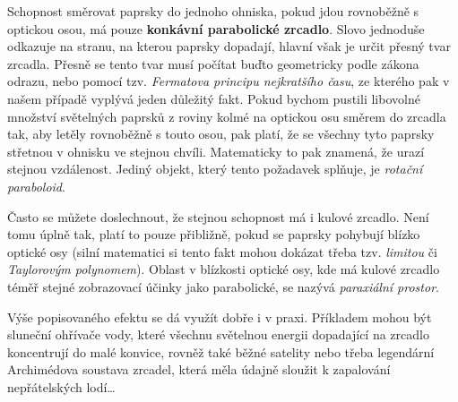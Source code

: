 \documentclass{../../../../style/mkimain}
\begin{document}
\noindent{}
\klein
Schopnost směrovat paprsky do jednoho ohniska, pokud jdou rovnoběžně s optickou osou, má pouze \textbf{konkávní parabolické zrcadlo}.
Slovo  jednoduše odkazuje na stranu, na kterou paprsky dopadají, hlavní však je určit přesný tvar zrcadla.
Přesně se tento tvar musí počítat buďto geometricky podle zákona odrazu, nebo pomocí tzv. \emph{Fermatova principu nejkratšího času},
ze kterého pak v našem případě vyplývá jeden důležitý fakt.
Pokud bychom pustili libovolné množství světelných paprsků z roviny kolmé na optickou osu směrem do zrcadla tak,
aby letěly rovnoběžně s touto osou, pak platí, že se všechny tyto paprsky střetnou v ohnisku ve stejnou chvíli.
Matematicky to pak znamená, že urazí stejnou vzdálenost. Jediný objekt, který tento požadavek splňuje, je \emph{rotační paraboloid}.

Často se můžete doslechnout, že stejnou schopnost má i kulové zrcadlo. Není tomu úplně tak, platí to pouze přibližně,
pokud se paprsky pohybují blízko optické osy (silní matematici si tento fakt mohou dokázat třeba tzv.
\emph{limitou} či \emph{Taylorovým polynomem}).
Oblast v blízkosti optické osy, kde má kulové zrcadlo téměř stejné zobrazovací účinky jako parabolické, se nazývá \emph{paraxiální prostor}.


Výše popisovaného efektu se dá využít dobře i v praxi.
Příkladem mohou být sluneční ohřívače vody, které všechnu světelnou energii dopadající na zrcadlo koncentrují do malé konvice,
rovněž také běžné satelity nebo třeba legendární Archimédova soustava zrcadel, která měla údajně sloužit k zapalování nepřátelských lodí\dots 
\end{document}
